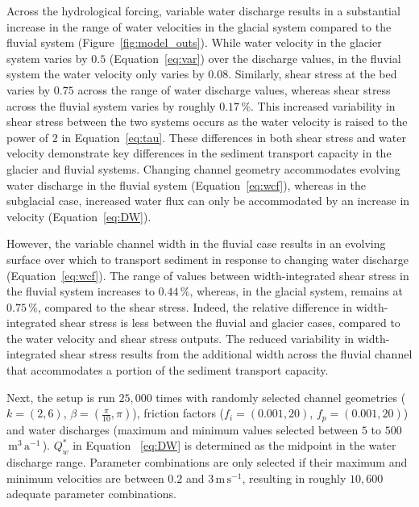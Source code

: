 \documentclass[11pt]{article}
\newcommand{\mmma}{$\,\mathrm{m^3\, a^{-1}}$\,}
\newcommand{\unit}[1]{$\mathrm{#1}$}
\begin{document}
\begin{spacing}{1}
  Across the hydrological forcing, variable water discharge results in a substantial increase in the range of water velocities in the glacial system compared to the fluvial system (Figure~\ref{fig:model_outs}).
  While water velocity in the glacier system varies by  $0.5$ (Equation~\ref{eq:var}) over the discharge values, in the fluvial system the water velocity only varies by $0.08$.
  Similarly, shear stress at the bed varies by $0.75$ across the range of water discharge values, whereas shear stress across the fluvial system varies by roughly $0.17$\,\%. This increased variability  in shear stress between the two systems occurs as the water velocity is raised to the power of $2$ in Equation~\ref{eq:tau}. 
  These differences in both shear stress and water velocity demonstrate key differences in the sediment transport capacity in the glacier and fluvial systems.
  Changing channel geometry accommodates evolving water discharge in the fluvial system (Equation~\ref{eq:wcf}), whereas in the subglacial case, increased water flux can only be accommodated by an increase in velocity (Equation~\ref{eq:DW}).
  
  However, the variable channel width in the fluvial case results in an evolving surface over which to transport sediment in response to changing water discharge (Equation~\ref{eq:wcf}).
  The range of values between width-integrated shear stress in the fluvial system increases to $0.44$\,\%, whereas, in the glacial system, remains at $0.75$\,\%, compared to the shear stress.
  Indeed, the relative  difference in width-integrated shear stress is less between the fluvial and glacier cases, compared to the water velocity and shear stress outputs.
  The reduced variability in width-integrated shear stress results from the additional width across the fluvial channel that accommodates a portion of the sediment transport capacity.

  Next, the setup is run $25,000$ times with randomly selected channel geometries ($k=(2,6)$, $\beta=(\frac{\pi}{10},\pi)$), friction factors ($f_i=(0.001,20)$, $f_p=(0.001,20)$) and water discharges (maximum and minimum values selected between $5$ to $500$ \,\mmma). $Q_w^*$ in Equation ~\ref{eq:DW} is determined as the midpoint in the water discharge range. Parameter combinations are only selected if their maximum and minimum velocities are between $0.2$ and $3$\,\unit{m}\,\unit{s}$^{-1}$, resulting in roughly $10,600$ adequate parameter combinations. 
  

\end{spacing}
\end{document}

